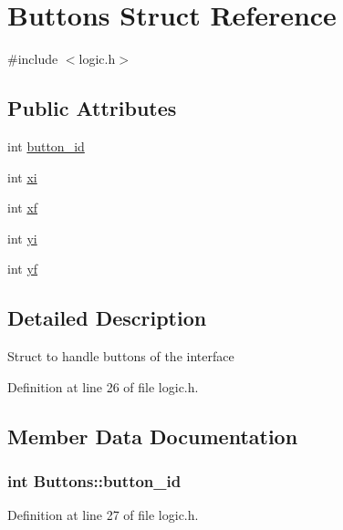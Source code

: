 \hypertarget{struct_buttons}{}\section{Buttons Struct Reference}
\label{struct_buttons}


{\ttfamily \#include $<$logic.\+h$>$}

\subsection*{Public Attributes}
\begin{DoxyCompactItemize}
\item 
int \hyperlink{struct_buttons_ac368fa1c9455110f49759eebaa304684}{button\+\_\+id}
\item 
int \hyperlink{struct_buttons_a2ecf7ff3728004e014316b1abf219616}{xi}
\item 
int \hyperlink{struct_buttons_a9eca94a4f9d872c5c24c1224e7d4282a}{xf}
\item 
int \hyperlink{struct_buttons_a36cc9f309e255a9d7d4a1f65f9179877}{yi}
\item 
int \hyperlink{struct_buttons_a5b83d4b03c97b941d117a7792858c376}{yf}
\end{DoxyCompactItemize}


\subsection{Detailed Description}
Struct to handle buttons of the interface 

Definition at line 26 of file logic.\+h.



\subsection{Member Data Documentation}
\hypertarget{struct_buttons_ac368fa1c9455110f49759eebaa304684}{}
\subsubsection[{button\+\_\+id}]{\setlength{\rightskip}{0pt plus 5cm}int Buttons\+::button\+\_\+id}\label{struct_buttons_ac368fa1c9455110f49759eebaa304684}


Definition at line 27 of file logic.\+h.

\hypertarget{struct_buttons_a9eca94a4f9d872c5c24c1224e7d4282a}{}
